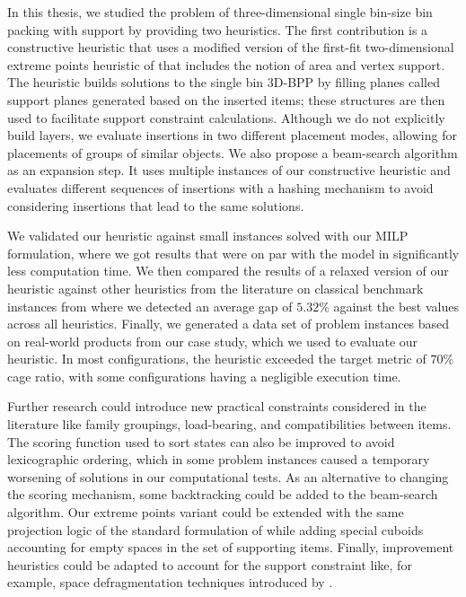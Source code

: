 In this thesis, we studied the problem of three-dimensional single bin-size bin packing with support by providing two heuristics. 
The first contribution is a constructive heuristic that uses a modified version of the first-fit two-dimensional extreme points heuristic of \citet{crainic2008extreme} that includes the notion of area and vertex support.
The heuristic builds solutions to the single bin 3D-BPP by filling planes called support planes generated based on the inserted items; these structures are then used to facilitate support constraint calculations. 
Although we do not explicitly build layers, we evaluate insertions in two different placement modes, allowing for placements of groups of similar objects.
We also propose a beam-search algorithm as an expansion step. It uses multiple instances of our constructive heuristic and evaluates different sequences of insertions with a hashing mechanism to avoid considering insertions that lead to the same solutions.

We validated our heuristic against small instances solved with our MILP formulation, where we got results that were on par with the model in significantly less computation time.
We then compared the results of a relaxed version of our heuristic against other heuristics from the literature on classical benchmark instances from \citet{martello2000three} where we detected an average gap of $5.32\%$ against the best values across all heuristics.
Finally, we generated a data set of problem instances based on real-world products from our case study, which we used to evaluate our heuristic. In most configurations, the heuristic exceeded the target metric of $70\%$ cage ratio, with some configurations having a negligible execution time.

Further research could introduce new practical constraints considered in the literature like family groupings, load-bearing, and compatibilities between items.
The scoring function used to sort states can also be improved to avoid lexicographic ordering, which in some problem instances caused a temporary worsening of solutions in our computational tests.
As an alternative to changing the scoring mechanism, some backtracking could be added to the beam-search algorithm.
Our extreme points variant could be extended with the same projection logic of the standard formulation of \citet{crainic2008extreme} while adding special cuboids accounting for empty spaces in the set of supporting items.
Finally, improvement heuristics could be adapted to account for the support constraint like, for example, space defragmentation techniques introduced by \cite{ZHU2012452}.